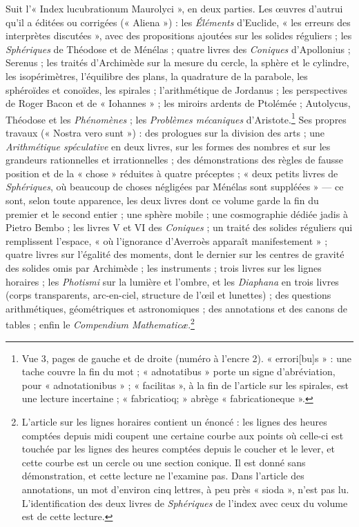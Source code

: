 \documentclass[11pt,a4paper]{article}
\begin{document}
Suit l'« Index lucubrationum Maurolyci », en deux parties. Les œuvres
d'autrui qu'il a éditées ou corrigées (« Aliena ») : les \emph{Éléments}
d'Euclide, « les erreurs des interprètes discutées », avec des propositions
ajoutées sur les solides réguliers ; les \emph{Sphériques} de Théodose et de
Ménélas ; quatre livres des \emph{Coniques} d'Apollonius ; Serenus ; les
traités d'Archimède sur la mesure du cercle, la sphère et le cylindre, les
isopérimètres, l'équilibre des plans, la quadrature de la parabole, les
sphéroïdes et conoïdes, les spirales ; l'arithmétique de Jordanus ; les
perspectives de Roger Bacon et de « Iohannes » ; les miroirs ardents de
Ptolémée ; Autolycus, Théodose et les \emph{Phénomènes} ; les \emph{Problèmes
mécaniques} d'Aristote.\footnote{Vue 3, pages de gauche et de droite (numéro à
l'encre 2). « errori[bu]s » : une tache couvre la fin du mot ; « adnotatibus »
porte un signe d'abréviation, pour « adnotationibus » ; « facilitas », à la
fin de l'article sur les spirales, est une lecture incertaine ;
« fabricatioq; » abrège « fabricationeque ».} Ses propres travaux (« Nostra
vero sunt ») : des prologues sur la division des arts ; une \emph{Arithmétique
spéculative} en deux livres, sur les formes des nombres et sur les grandeurs
rationnelles et irrationnelles ; des démonstrations des règles de fausse
position et de la « chose » réduites à quatre préceptes ; « deux petits livres
de \emph{Sphériques}, où beaucoup de choses négligées par Ménélas sont
suppléées » — ce sont, selon toute apparence, les deux livres dont ce volume
garde la fin du premier et le second entier ; une sphère mobile ; une
cosmographie dédiée jadis à Pietro Bembo ; les livres V et VI des
\emph{Coniques} ; un traité des solides réguliers qui remplissent l'espace, « où
l'ignorance d'Averroès apparaît manifestement » ; quatre livres sur l'égalité
des moments, dont le dernier sur les centres de gravité des solides omis par
Archimède ; les instruments ; trois livres sur les lignes horaires ; les
\emph{Photismi} sur la lumière et l'ombre, et les \emph{Diaphana} en trois livres
(corps transparents, arc-en-ciel, structure de l'œil et lunettes) ; des
questions arithmétiques, géométriques et astronomiques ; des annotations et des
canons de tables ; enfin le \emph{Compendium Mathematicæ}.\footnote{L'article
sur les lignes horaires contient un énoncé : les lignes des heures comptées
depuis midi coupent une certaine courbe aux points où celle-ci est touchée par
les lignes des heures comptées depuis le coucher et le lever, et cette courbe
est un cercle ou une section conique. Il est donné sans démonstration, et
cette lecture ne l'examine pas. Dans l'article des annotations, un mot d'environ
cinq lettres, à peu près « sioda », n'est pas lu. L'identification des deux
livres de \emph{Sphériques} de l'index avec ceux du volume est de cette
lecture.}
\end{document}

